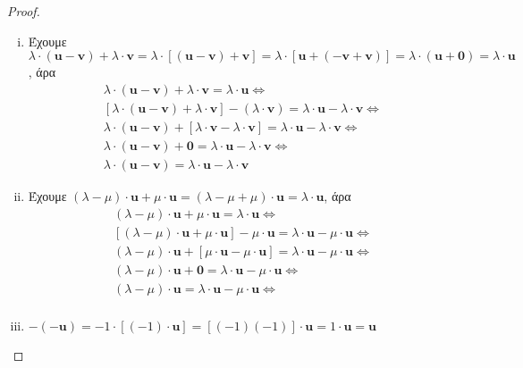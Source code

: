 \begin{proof}
\begin{enumerate}[i)]
    \item Έχουμε $ \lambda\cdot (\mathbf{u} - \mathbf{v}) + \lambda \cdot 
      \mathbf{v} = \lambda \cdot [(\mathbf{u} - \mathbf{v}) + \mathbf{v}] = 
      \lambda \cdot [\mathbf{u} + (- \mathbf{v}+ \mathbf{v})] = \lambda \cdot 
      ( \mathbf{u} + \mathbf{0}) = \lambda \cdot \mathbf{u} $, άρα 
      \begin{gather*}
        \lambda \cdot (\mathbf{u} - \mathbf{v}) + \lambda \cdot \mathbf{v} = 
        \lambda \cdot \mathbf{u} \Leftrightarrow \\ 
        [\lambda \cdot (\mathbf{u} - \mathbf{v}) + \lambda \cdot \mathbf{v}] -
        (\lambda \cdot \mathbf{v})= 
        \lambda \cdot \mathbf{u} - \lambda \cdot \mathbf{v} \Leftrightarrow \\
        \lambda \cdot (\mathbf{u} - \mathbf{v}) + 
        [\lambda \cdot \mathbf{v} - \lambda \cdot \mathbf{v}] =
        \lambda \cdot \mathbf{u} - \lambda \cdot \mathbf{v} \Leftrightarrow \\
        \lambda \cdot (\mathbf{u}- \mathbf{v}) + \mathbf{0} = \lambda \cdot 
        \mathbf{u} - \lambda \cdot \mathbf{v} \Leftrightarrow \\
        \lambda \cdot (\mathbf{u} - \mathbf{v}) = \lambda \cdot \mathbf{u} - 
        \lambda \cdot \mathbf{v}
      \end{gather*}

    \item Έχουμε $ (\lambda - \mu ) \cdot \mathbf{u} + \mu \cdot \mathbf{u} = 
      (\lambda - \mu + \mu )\cdot \mathbf{u} = \lambda \cdot \mathbf{u}$, άρα 
      \begin{gather*}
        (\lambda - \mu ) \cdot \mathbf{u} + \mu \cdot \mathbf{u} = 
        \lambda \cdot \mathbf{u} \Leftrightarrow \\
        [(\lambda - \mu )\cdot \mathbf{u} + \mu \cdot \mathbf{u}] - 
        \mu \cdot \mathbf{u} = \lambda \cdot \mathbf{u}- \mu \cdot 
        \mathbf{u} \Leftrightarrow \\
        (\lambda - \mu ) \cdot \mathbf{u} + [\mu \cdot \mathbf{u} - 
        \mu \cdot \mathbf{u}] = \lambda \cdot \mathbf{u}- \mu \cdot 
        \mathbf{u} \Leftrightarrow \\
        (\lambda - \mu )\cdot \mathbf{u} + \mathbf{0} = 
        \lambda \cdot \mathbf{u}- \mu \cdot \mathbf{u} \Leftrightarrow \\
        (\lambda - \mu )\cdot \mathbf{u} = 
        \lambda \cdot \mathbf{u}- \mu \cdot \mathbf{u} \Leftrightarrow \\
      \end{gather*}

    \item $ -(- \mathbf{u}) = -1\cdot [(-1)\cdot \mathbf{u}] = [(-1)(-1)] \cdot 
      \mathbf{u}= 1 \cdot \mathbf{u} = \mathbf{u} $
  \end{enumerate}
\end{proof}

